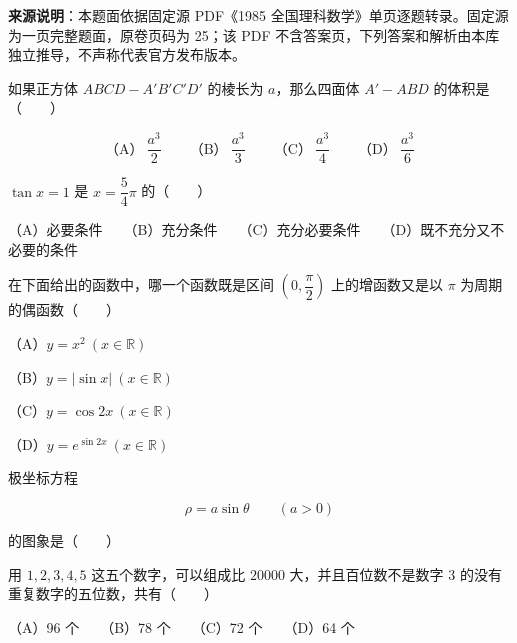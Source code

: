 


\begin{gktip}
\textbf{来源说明}：本题面依据固定源 PDF《1985 全国理科数学》单页逐题转录。固定源为一页完整题面，原卷页码为 25；该 PDF 不含答案页，下列答案和解析由本库独立推导，不声称代表官方发布版本。
\end{gktip}

\begin{question}
如果正方体 $ABCD-A'B'C'D'$ 的棱长为 $a$，那么四面体 $A'-ABD$ 的体积是\mbox{（　　）}

\nopagebreak[4]
\[
\text{（A）}\ \frac{a^3}{2}
\qquad
\text{（B）}\ \frac{a^3}{3}
\qquad
\text{（C）}\ \frac{a^3}{4}
\qquad
\text{（D）}\ \frac{a^3}{6}
\]

\end{question}
\begin{question}
$\tan x=1$ 是 $x=\dfrac54\pi$ 的\mbox{（　　）}

（A）必要条件　　（B）充分条件　　（C）充分必要条件　　（D）既不充分又不必要的条件

\end{question}
\begin{question}
在下面给出的函数中，哪一个函数既是区间 $\left(0,\dfrac\pi2\right)$ 上的增函数又是以 $\pi$ 为周期的偶函数\mbox{（　　）}

（A）$y=x^2\ (x\in\mathbb R)$

（B）$y=|\sin x|\ (x\in\mathbb R)$

（C）$y=\cos2x\ (x\in\mathbb R)$

（D）$y=e^{\sin2x}\ (x\in\mathbb R)$

\Needspace{0.4\textheight}
\end{question}
\begin{question}
极坐标方程

\nopagebreak[4]
\[
\rho=a\sin\theta\qquad(a>0)
\]

的图象是\mbox{（　　）}
\nopagebreak[4]
\begin{center}\end{center}
\nopagebreak[4]
\end{question}
\begin{question}
用 $1,2,3,4,5$ 这五个数字，可以组成比 $20000$ 大，并且百位数不是数字 $3$ 的没有重复数字的五位数，共有\mbox{（　　）}

（A）96 个　　（B）78 个　　（C）72 个　　（D）64 个

\end{question}

